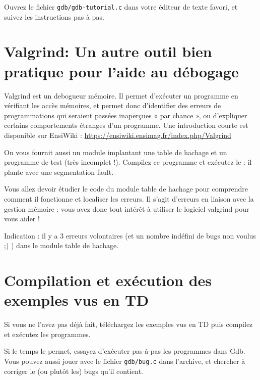 \documentclass[11pt]{article}
\begin{document}
Ouvrez le fichier {\tt gdb/gdb-tutorial.c} dans votre éditeur de texte
favori, et suivez les instructions pas à pas.

\section{Valgrind: Un autre outil bien pratique pour l'aide au débogage}

Valgrind est un debogueur mémoire. Il permet d'exécuter un programme
en vérifiant les accès mémoires, et permet donc d'identifier des
erreurs de programmations qui seraient passées inaperçues « par
chance », ou d'expliquer certains comportements étranges d'un
programme. Une introduction courte est disponible sur EnsiWiki :
\url{https://ensiwiki.ensimag.fr/index.php/Valgrind}

On vous fournit aussi un module implantant une table de hachage et un
programme de test (très incomplet !). Compilez ce programme et
exécutez le : il plante avec une segmentation fault.

Vous allez devoir étudier le code du module table de hachage pour
comprendre comment il fonctionne et localiser les erreurs. Il s'agit
d'erreurs en liaison avec la gestion mémoire : vous avez donc tout
intérêt à utiliser le logiciel valgrind pour vous aider !

Indication : il y a 3 erreurs volontaires (et un nombre indéfini de
bugs non voulus ;) ) dans le module table de hachage.

\section{Compilation et exécution des exemples vus en TD}

Si vous ne l'avez pas déjà fait, téléchargez les exemples vus en TD
puis compilez et exécutez les programmes.

Si le temps le permet, essayez d'exécuter pas-à-pas les programmes
dans Gdb. Vous pouvez aussi jouer avec le fichier {\tt gdb/bug.c} dans
l'archive, et chercher à corriger le (ou plutôt les) bugs qu'il
contient.



\end{document}
